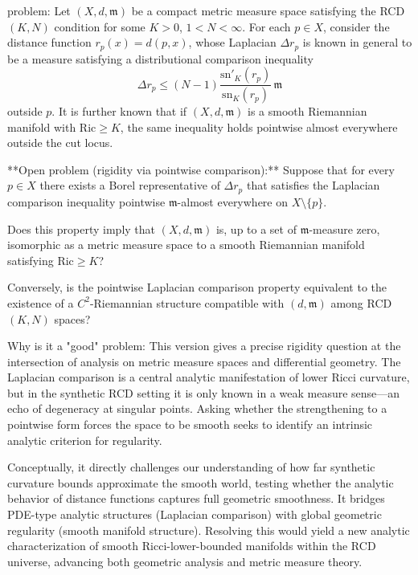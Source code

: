 problem:  
Let \((X,d,\mathfrak{m})\) be a compact metric measure space satisfying the RCD\((K,N)\) condition for some \(K>0\), \(1<N<\infty\). For each \(p\in X\), consider the distance function \(r_p(x)=d(p,x)\), whose Laplacian \(\Delta r_p\) is known in general to be a measure satisfying a distributional comparison inequality
\[
\Delta r_p \le (N-1)\frac{\mathrm{sn}'_K(r_p)}{\mathrm{sn}_K(r_p)}\,\mathfrak{m}
\]
outside \(p\).  
It is further known that if \((X,d,\mathfrak{m})\) is a smooth Riemannian manifold with \(\mathrm{Ric}\ge K\), the same inequality holds pointwise almost everywhere outside the cut locus.  

**Open problem (rigidity via pointwise comparison):**  
Suppose that for every \(p\in X\) there exists a Borel representative of \(\Delta r_p\) that satisfies the Laplacian comparison inequality pointwise \(\mathfrak{m}\)-almost everywhere on \(X\setminus\{p\}\).  

Does this property imply that \((X,d,\mathfrak{m})\) is, up to a set of \(\mathfrak{m}\)-measure zero, isomorphic as a metric measure space to a smooth Riemannian manifold satisfying \(\mathrm{Ric}\ge K\)?  

Conversely, is the pointwise Laplacian comparison property equivalent to the existence of a \(C^{2}\)-Riemannian structure compatible with \((d,\mathfrak{m})\) among RCD\((K,N)\) spaces?  

Why is it a "good" problem:  
This version gives a precise rigidity question at the intersection of analysis on metric measure spaces and differential geometry. The Laplacian comparison is a central analytic manifestation of lower Ricci curvature, but in the synthetic RCD setting it is only known in a weak measure sense—an echo of degeneracy at singular points. Asking whether the strengthening to a pointwise form forces the space to be smooth seeks to identify an intrinsic analytic criterion for regularity.  

Conceptually, it directly challenges our understanding of how far synthetic curvature bounds approximate the smooth world, testing whether the analytic behavior of distance functions captures full geometric smoothness. It bridges PDE-type analytic structures (Laplacian comparison) with global geometric regularity (smooth manifold structure). Resolving this would yield a new analytic characterization of smooth Ricci-lower-bounded manifolds within the RCD universe, advancing both geometric analysis and metric measure theory.